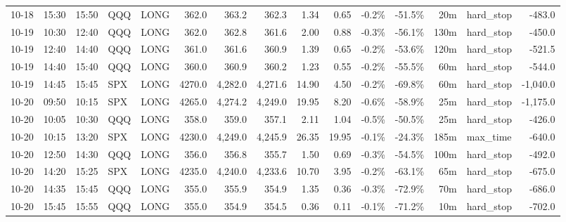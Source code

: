 \documentclass[11pt,a4paper,twoside]{article}
\begin{document}
\begin{landscape}
\begin{center}
\begin{longtable}{>{\color{txtmain}}l l l l l r r r r r r r r >{\color{txtmain}}l r}
10-18 & 15:30 & 15:50 & QQQ & LONG & 362.0 & 363.2 & 362.3 & 1.34 & 0.65 & \textcolor{lossred}{-0.2\%} & \textcolor{lossred}{-51.5\%} & 20m & hard\_stop & \textcolor{lossred}{-483.0} \\
10-19 & 10:30 & 12:40 & QQQ & LONG & 362.0 & 362.8 & 361.6 & 2.00 & 0.88 & \textcolor{lossred}{-0.3\%} & \textcolor{lossred}{-56.1\%} & 130m & hard\_stop & \textcolor{lossred}{-450.0} \\
10-19 & 12:40 & 14:40 & QQQ & LONG & 361.0 & 361.6 & 360.9 & 1.39 & 0.65 & \textcolor{lossred}{-0.2\%} & \textcolor{lossred}{-53.6\%} & 120m & hard\_stop & \textcolor{lossred}{-521.5} \\
10-19 & 14:40 & 15:40 & QQQ & LONG & 360.0 & 360.9 & 360.2 & 1.23 & 0.55 & \textcolor{lossred}{-0.2\%} & \textcolor{lossred}{-55.5\%} & 60m & hard\_stop & \textcolor{lossred}{-544.0} \\
10-19 & 14:45 & 15:45 & SPX & LONG & 4270.0 & 4,282.0 & 4,271.6 & 14.90 & 4.50 & \textcolor{lossred}{-0.2\%} & \textcolor{lossred}{-69.8\%} & 60m & hard\_stop & \textcolor{lossred}{-1,040.0} \\
10-20 & 09:50 & 10:15 & SPX & LONG & 4265.0 & 4,274.2 & 4,249.0 & 19.95 & 8.20 & \textcolor{lossred}{-0.6\%} & \textcolor{lossred}{-58.9\%} & 25m & hard\_stop & \textcolor{lossred}{-1,175.0} \\
10-20 & 10:05 & 10:30 & QQQ & LONG & 358.0 & 359.0 & 357.1 & 2.11 & 1.04 & \textcolor{lossred}{-0.5\%} & \textcolor{lossred}{-50.5\%} & 25m & hard\_stop & \textcolor{lossred}{-426.0} \\
10-20 & 10:15 & 13:20 & SPX & LONG & 4230.0 & 4,249.0 & 4,245.9 & 26.35 & 19.95 & \textcolor{lossred}{-0.1\%} & \textcolor{lossred}{-24.3\%} & 185m & max\_time & \textcolor{lossred}{-640.0} \\
10-20 & 12:50 & 14:30 & QQQ & LONG & 356.0 & 356.8 & 355.7 & 1.50 & 0.69 & \textcolor{lossred}{-0.3\%} & \textcolor{lossred}{-54.5\%} & 100m & hard\_stop & \textcolor{lossred}{-492.0} \\
10-20 & 14:20 & 15:25 & SPX & LONG & 4235.0 & 4,240.0 & 4,233.6 & 10.70 & 3.95 & \textcolor{lossred}{-0.2\%} & \textcolor{lossred}{-63.1\%} & 65m & hard\_stop & \textcolor{lossred}{-675.0} \\
10-20 & 14:35 & 15:45 & QQQ & LONG & 355.0 & 355.9 & 354.9 & 1.35 & 0.36 & \textcolor{lossred}{-0.3\%} & \textcolor{lossred}{-72.9\%} & 70m & hard\_stop & \textcolor{lossred}{-686.0} \\
10-20 & 15:45 & 15:55 & QQQ & LONG & 355.0 & 354.9 & 354.5 & 0.36 & 0.11 & \textcolor{lossred}{-0.1\%} & \textcolor{lossred}{-71.2\%} & 10m & hard\_stop & \textcolor{lossred}{-702.0} \\

\end{longtable}
\end{center}
\end{landscape}
\end{document}
